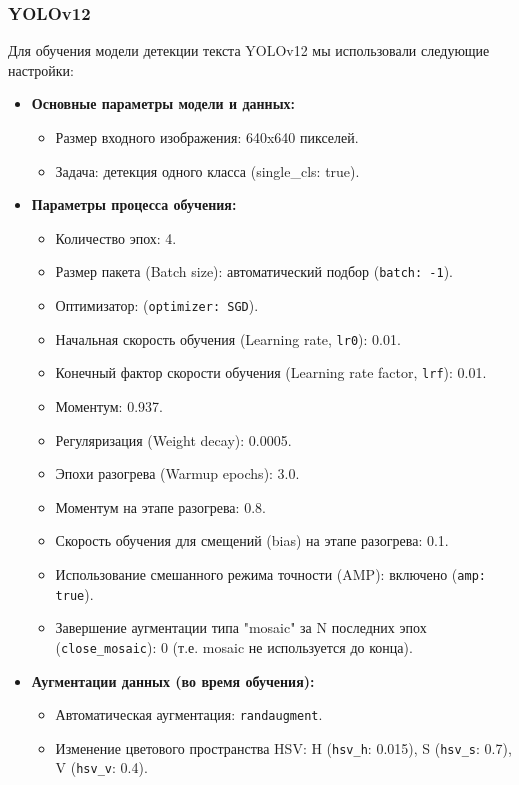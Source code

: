 \documentclass[12pt, a4paper]{article}
\theoremstyle{definition}
\theoremstyle{remark}
\begin{document}
	\subsubsection{YOLOv12}
	Для обучения модели детекции текста YOLOv12 мы использовали следующие настройки:
	\begin{itemize}
		\item \textbf{Основные параметры модели и данных:}
		\begin{itemize}
			\item Размер входного изображения: 640x640 пикселей.
			\item Задача: детекция одного класса (single\_cls: true).
		\end{itemize}
		\item \textbf{Параметры процесса обучения:}
		\begin{itemize}
			\item Количество эпох: 4.
			\item Размер пакета (Batch size): автоматический подбор (\texttt{batch: -1}).
			\item Оптимизатор: (\texttt{optimizer: SGD}).
			\item Начальная скорость обучения (Learning rate, \texttt{lr0}): 0.01.
			\item Конечный фактор скорости обучения (Learning rate factor, \texttt{lrf}): 0.01.
			\item Моментум: 0.937.
			\item Регуляризация (Weight decay): 0.0005.
			\item Эпохи разогрева (Warmup epochs): 3.0.
			\item Моментум на этапе разогрева: 0.8.
			\item Скорость обучения для смещений (bias) на этапе разогрева: 0.1.
			\item Использование смешанного режима точности (AMP): включено (\texttt{amp: true}).
			\item Завершение аугментации типа "mosaic" за N последних эпох (\texttt{close\_mosaic}): 0 (т.е. mosaic не используется до конца).
		\end{itemize}
		\item \textbf{Аугментации данных (во время обучения):}
		\begin{itemize}
			\item Автоматическая аугментация: \texttt{randaugment}.
			\item Изменение цветового пространства HSV: H (\texttt{hsv\_h}: 0.015), S (\texttt{hsv\_s}: 0.7), V (\texttt{hsv\_v}: 0.4).

\end{itemize}
\end{itemize}
\end{document}

